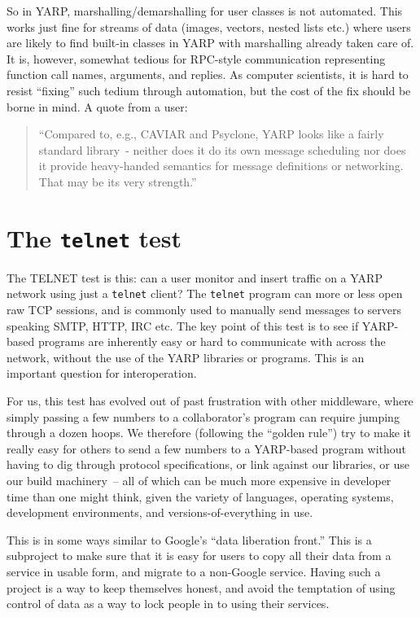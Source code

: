 \documentclass[letterpaper]{article}
\begin{document}
So in YARP, marshalling/demarshalling for user classes
is not automated.  This works
just fine for streams of data (images, vectors, nested lists etc.)
where users are likely to find built-in classes in YARP with
marshalling already taken care of.  It is, however, somewhat tedious
for RPC-style communication representing function call names,
arguments, and replies.  As computer scientists, it is hard to
resist ``fixing'' such tedium through automation, but the cost
of the fix should be borne in mind.  A quote from a user:

\begin{quote}
``Compared to, e.g., CAVIAR and Psyclone, YARP
looks like a fairly standard library~- neither does it
do its own message scheduling nor does it provide
heavy-handed semantics for message definitions or
networking. That may be its very strength.'' \cite{stefansson09yarp}
\end{quote}


\section{The {\tt telnet} test}

The TELNET test is this: can a user monitor and insert traffic on a
YARP network using just a {\tt telnet} client?  The {\tt telnet}
program can more or less open raw TCP sessions, and is commonly used
to manually send messages to servers speaking SMTP, HTTP, IRC etc.
The key point of this test is to see if YARP-based programs are
inherently easy or hard to communicate with across the network,
without the use of the YARP libraries or programs.  This is an
important question for interoperation.

For us, this test has evolved out of past frustration with other
middleware, where simply passing a few numbers to a collaborator's
program can require jumping through a dozen hoops.  We therefore
(following the ``golden rule'') try to make it really easy for others
to send a few numbers to a YARP-based program without having to dig
through protocol specifications, or link against our libraries, or use
our build machinery~-- all of which can be much more expensive in
developer time than one might think, given the variety of languages,
operating systems, development environments, and
versions-of-everything in use.

This is in some ways similar to Google's ``data liberation front.''
This is a subproject to make sure that it is easy for users to copy
all their data from a service in usable form, and migrate to a
non-Google service.  Having such 
a project is a way to keep themselves honest, and avoid the 
temptation of using control of data as a way to lock people in to
using their services.
\end{document}
